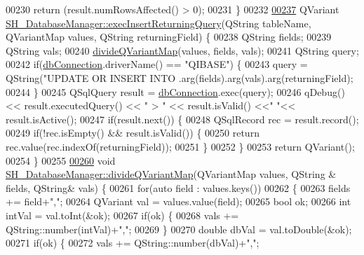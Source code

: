 \begin{DoxyCode}
{{{{00230     \textcolor{keywordflow}{return} (result.numRowsAffected() > 0);
00231 \}
00232 
\hypertarget{SH__DatabaseManager_8cpp_source_l00237}{}\hyperlink{classSH__DatabaseManager_a1c0399265021ed79a1c07a0e01c7a5dc}{00237} QVariant \hyperlink{classSH__DatabaseManager_a1c0399265021ed79a1c07a0e01c7a5dc}{SH\_DatabaseManager::execInsertReturningQuery}(QString 
      tableName, QVariantMap values, QString returningField) \{
00238     QString fields;
00239     QString vals;
00240     \hyperlink{classSH__DatabaseManager_acab8936d9c694610eda1c157a405ead3}{divideQVariantMap}(values, fields, vals);
00241     QString query;
00242     \textcolor{keywordflow}{if}(\hyperlink{classSH__DatabaseManager_a9291f61c3abbba2c4f1567b1d8325f0e}{dbConnection}.driverName() == \textcolor{stringliteral}{"QIBASE"}) \{
00243         query = QString(\textcolor{stringliteral}{"UPDATE OR INSERT INTO %
      .arg(fields).arg(vals).arg(returningField);
00244     \}
00245     QSqlQuery result = \hyperlink{classSH__DatabaseManager_a9291f61c3abbba2c4f1567b1d8325f0e}{dbConnection}.exec(query);
00246     qDebug() << result.executedQuery() << \textcolor{stringliteral}{" > "} << result.isValid() <<\textcolor{stringliteral}{" "}<< result.isActive();
00247     \textcolor{keywordflow}{if}(result.next()) \{
00248         QSqlRecord rec = result.record();
00249         \textcolor{keywordflow}{if}(!rec.isEmpty()  && result.isValid()) \{
00250             \textcolor{keywordflow}{return} rec.value(rec.indexOf(returningField));
00251         \}
00252     \}
00253     \textcolor{keywordflow}{return} QVariant();
00254 \}
00255 
\hypertarget{SH__DatabaseManager_8cpp_source_l00260}{}\hyperlink{classSH__DatabaseManager_acab8936d9c694610eda1c157a405ead3}{00260} \textcolor{keywordtype}{void} \hyperlink{classSH__DatabaseManager_acab8936d9c694610eda1c157a405ead3}{SH\_DatabaseManager::divideQVariantMap}(QVariantMap values, QString
      & fields, QString& vals) \{
00261     \textcolor{keywordflow}{for}(\textcolor{keyword}{auto} field : values.keys())
00262     \{
00263         fields += field+\textcolor{stringliteral}{","};
00264         QVariant val = values.value(field);
00265         \textcolor{keywordtype}{bool} ok;
00266         \textcolor{keywordtype}{int} intVal = val.toInt(&ok);
00267         \textcolor{keywordflow}{if}(ok) \{
00268             vals += QString::number(intVal)+\textcolor{stringliteral}{","};
00269         \}
00270         \textcolor{keywordtype}{double} dbVal = val.toDouble(&ok);
00271         \textcolor{keywordflow}{if}(ok) \{
00272             vals += QString::number(dbVal)+\textcolor{stringliteral}{","};
}}}}}
\end{DoxyCode}
